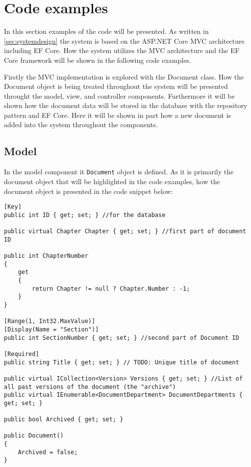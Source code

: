 \section{Code examples}
In this section examples of the code will be presented.
As written in \cref{sec:systemdesign} the system is based on the ASP.NET Core MVC architecture including EF Core.
How the system utilizes the MVC architecture and the EF Core framework will be shown in the following code examples.

Firstly the MVC implementation is explored with the Document class.
How the Document object is being treated throughout the system will be presented throught the model, view, and controller components.
Furthermore it will be shown how the document data will be stored in the database with the repository pattern and EF Core.
Here it will be shown in part how a new document is added into the system throughout the components.

\subsection{Model}

In the model component it \texttt{Document} object is defined.
As it is primarily the document object that will be highlighted in the code examples, how the document object is presented in the code snippet below:
\\
\begin{lstlisting}[caption={Document Model: Document object}, label={lst:doc}]
[Key]
public int ID { get; set; } //for the database

public virtual Chapter Chapter { get; set; } //first part of document ID

public int ChapterNumber
{
	get
	{
		return Chapter != null ? Chapter.Number : -1;
	}
}

[Range(1, Int32.MaxValue)]
[Display(Name = "Section")]
public int SectionNumber { get; set; } //second part of Document ID

[Required]
public string Title { get; set; } // TODO: Unique title of document

public virtual ICollection<Version> Versions { get; set; } //List of all past versions of the document (the "archive")
public virtual IEnumerable<DocumentDepartment> DocumentDepartments { get; set; }

public bool Archived { get; set; }

public Document()
{
	Archived = false;
}
\end{lstlisting}

